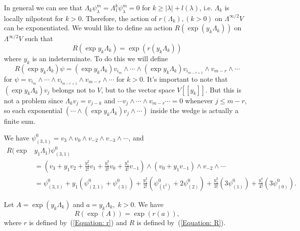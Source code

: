 In general we can see that $\Lambda_k\psi_{\lambda}^m=\Lambda_1^k\psi_\lambda^m=0$ for $k\geq |\lambda|+l(\lambda)$, i.e. $\Lambda_k$ is locally nilpotent for $k>0$. Therefore, the action of $r(\Lambda_k), (k>0)$ on $\Lambda^{\infty/2}V$ can be exponentiated. We would like to define an action $R(\exp(y_k\Lambda_k))$ on $\Lambda^{\infty/2}V$ such that 
\begin{equation}\label{Equation: relation between exponention of actions on the Dirac sea}
    R(\exp y_k\Lambda_k) = \exp(r(y_k\Lambda_k))
\end{equation}
where $y_k$ is an indeterminate. To do this we will define
\begin{equation}\label{Equation: R}
    R(\exp y_k\Lambda_k)\psi = (\exp y_k\Lambda_k)v_{i_m}\wedge\cdots\wedge (\exp y_k\Lambda_k)v_{i_{m-r+1}}\wedge v_{m-r}\wedge\cdots
\end{equation}
for $\psi=v_{i_m}\wedge\cdots\wedge v_{i_{m-r+1}}\wedge v_{m-r}\wedge\cdots$ for $k>0$. It's important to note that $(\exp y_k\Lambda_k)v_j$ belongs not to $V$, but to the vector space $V[[y_k]]$. But this is not a problem since  $\Lambda_kv_j=v_{j-k}$ and $\cdots v_j\wedge\cdots\wedge v_{m-r}\cdots =0$ whenever $j\leq m-r$, so each exponential $(\cdots\wedge(\exp y_k\Lambda_k)v_j\wedge\cdots)$ inside the wedge is actually a finite sum. 
\begin{dang}
    \begin{example}\label{Example: action of exp(y1_Lambda1) on psi(3,1)}
    We have $\psi_{(3,1)}^0=v_3\wedge v_0\wedge v_{-2}\wedge v_{-3}\wedge\cdots$, and
        \begin{equation}
        \begin{split}
              R(\exp& y_1\Lambda_1)\psi_{(3,1)}^0\\
              &=\left(v_3+y_1v_2+\frac{y_1^2}{2!}v_1+\frac{y_1^3}{3!}v_0+\frac{y_1^4}{4!}v_{-1}\right)\wedge(v_0+y_1v_{-1})\wedge v_{-2}\wedge\cdots\\
              &=\psi_{(3,1)}^0+y_1(\psi_{(2,1)}^0+\psi_{(3)}^0)+\frac{y_1^2}{2!}(\psi_{(1^2)}^0+2\psi_{(2)}^0)+\frac{y_1^3}{3!}(3\psi_{(1)}^0)+\frac{y_1^4}{4!}(3\psi_{(0)}^0).
        \end{split}
        \end{equation}
    \end{example}
\end{dang}
\begin{dang}
    \begin{theorem}\cite{kac2013bombay}\label{Theorem: R(exp a)= exp(r a)}
        Let $A=\exp(y_k\Lambda_k)$ and $a=y_k\Lambda_k,\; k>0$. We have
        \begin{equation}
            R(\exp(A))=\exp(r(a)),
        \end{equation}
        where $r$ is defined by~(\ref{Equation: r}) and $R$ is defined by~(\ref{Equation: R}).
    \end{theorem}
\end{dang}
